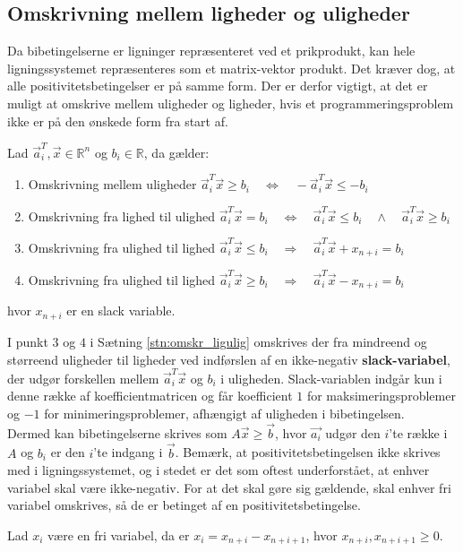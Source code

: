 \subsection{Omskrivning mellem ligheder og uligheder}
Da bibetingelserne er ligninger repræsenteret ved et prikprodukt, kan hele ligningssystemet repræsenteres som et matrix-vektor produkt. Det kræver dog, at alle positivitetsbetingelser er på samme form. Der er derfor vigtigt, at det er muligt at omskrive mellem uligheder og ligheder, hvis et programmeringsproblem ikke er på den ønskede form fra start af.

\begin{stn}
Lad $\vec{a}_i^T,\vec{x} \in \mathds{R}^n$ og $b_i \in \mathds{R}$, da gælder:
\begin{enumerate}
\item Omskrivning mellem uligheder \qquad \quad $\vec{a}_i^T\vec{x} \geq b_i \quad \Leftrightarrow \quad -\vec{a}_i^T\vec{x} \leq -b_i$
\item Omskrivning fra lighed til ulighed \qquad  $\vec{a}_i^T\vec{x} = b_i \quad \Leftrightarrow  \quad  \vec{a}_i^T\vec{x} \leq b_i \quad \wedge \quad  \vec{a}_i^T\vec{x} \geq b_i$
\item Omskrivning fra ulighed til lighed \qquad $\vec{a}_i^T \vec{x}  \leq b_i \quad \Rightarrow \quad  \vec{a}_i^T \vec{x}  +  x_{n+i}  = b_i$
\item Omskrivning fra ulighed til lighed \qquad $\vec{a}_i^T \vec{x}  \geq b_i \quad \Rightarrow \quad  \vec{a}_i^T \vec{x}  - x_{n+i}  = b_i$
\end{enumerate}
hvor $x_{n+i}$ er en slack variable.
\label{stn:omskr_ligulig} 
\end{stn}

I punkt $3$ og $4$ i Sætning \ref{stn:omskr_ligulig} omskrives der fra mindreend og størreend uligheder til ligheder ved indførslen af en ikke-negativ \textbf{slack-variabel}, der udgør forskellen mellem $\vec{a}_i^T\vec{x}$ og $b_i$ i uligheden. Slack-variablen indgår kun i denne række af koefficientmatricen og får koefficient $1$ for maksimeringsproblemer og $-1$ for minimeringsproblemer, afhængigt af uligheden i bibetingelsen. \\

Dermed kan bibetingelserne skrives som $A\vec{x}\geq \vec{b}$, hvor $\vec{a_i}$ udgør den $i$'te række i $A$ og $b_i$ er den $i$'te indgang i $\vec{b}$.
Bemærk, at positivitetsbetingelsen ikke skrives med i ligningssystemet, og i stedet er det som oftest underforstået, at enhver variabel skal være ikke-negativ.
For at det skal gøre sig gældende, skal enhver fri variabel omskrives, så de er betinget af en positivitetsbetingelse.
\begin{stn}
Lad $x_i$ være en fri variabel, da er $x_i = x_{n+i}-x_{n+i+1}$, hvor $x_{n+i},x_{n+i+1}\geq 0$.
\end{stn}




